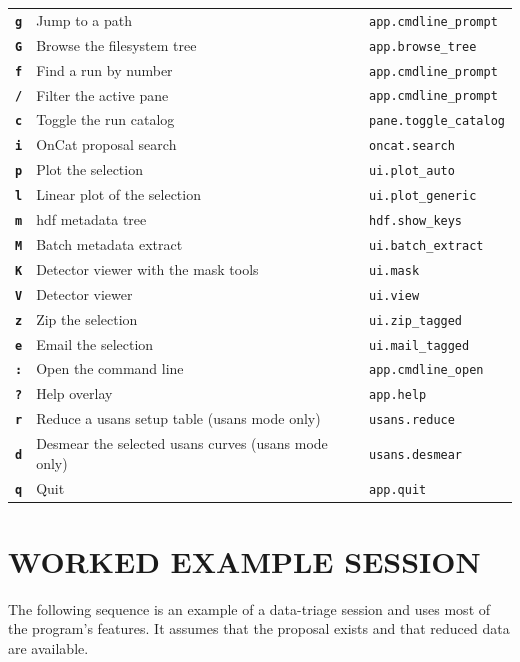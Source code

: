 \documentclass[tm]{ornltm}
\newcommand{\key}[1]{\textbf{\texttt{#1}}}
\begin{document}
\begin{small}
\begin{longtable}{p{} p{} p{}}
  \key{g} & Jump to a path & \texttt{app.cmdline\_prompt} \\
  \key{G} & Browse the filesystem tree & \texttt{app.browse\_tree} \\
  \key{f} & Find a run by number & \texttt{app.cmdline\_prompt} \\
  \key{/} & Filter the active pane & \texttt{app.cmdline\_prompt} \\
  \key{c} & Toggle the run catalog & \texttt{pane.toggle\_catalog} \\
  \key{i} & OnCat proposal search & \texttt{oncat.search} \\
  \key{p} & Plot the selection & \texttt{ui.plot\_auto} \\
  \key{l} & Linear plot of the selection & \texttt{ui.plot\_generic} \\
  \key{m} & \Ac{hdf} metadata tree & \texttt{hdf.show\_keys} \\
  \key{M} & Batch metadata extract & \texttt{ui.batch\_extract} \\
  \key{K} & Detector viewer with the mask tools & \texttt{ui.mask} \\
  \key{V} & Detector viewer & \texttt{ui.view} \\
  \key{z} & Zip the selection & \texttt{ui.zip\_tagged} \\
  \key{e} & Email the selection & \texttt{ui.mail\_tagged} \\
  \key{:} & Open the command line & \texttt{app.cmdline\_open} \\
  \key{?} & Help overlay & \texttt{app.help} \\
  \key{r} & Reduce a \ac{usans} setup table (\ac{usans} mode only) &
    \texttt{usans.reduce} \\
  \key{d} & Desmear the selected \ac{usans} curves (\ac{usans} mode only) &
    \texttt{usans.desmear} \\
  \key{q} & Quit & \texttt{app.quit} \\
\end{longtable}
\end{small}

\section{WORKED EXAMPLE SESSION}
\label{sec:appsession}

The following sequence is an example of a data-triage session and uses most of
the program's features. It assumes that the proposal exists and that reduced
data are available.
\end{document}
